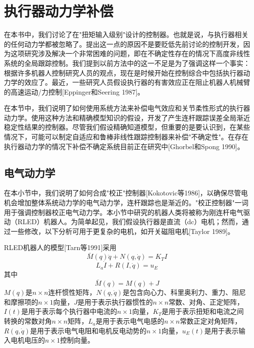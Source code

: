 \documentclass[UTF8]{ctexart}
\begin{document}
\section{执行器动力学补偿}

在本书中，我们讨论了在"扭矩输入级别"设计的控制器。也就是说，与执行器相关的任何动力学都被忽略了。提出这一点的原因不是要贬低先前讨论的控制开发，因为这项研究涉及解决一个非常困难的问题，即在不确定性存在的情况下高度非线性系统的全局跟踪控制。我们提到以前方法中的这一不足是为了强调这样一个事实：根据许多机器人控制研究人员的观点，现在是时候开始在控制综合中包括执行器动力学的效应了。最近，一些研究人员假设执行器的有害效应正在阻止机器人机械臂的高速运动/力控制[Eppinger和Seering 1987]。

在本节中，我们说明了如何使用系统方法来补偿电气效应和关节柔性形式的执行器动力学。使用这种方法和精确模型知识的假设，开发了产生连杆跟踪误差全局渐近稳定性结果的控制器。尽管我们假设精确知道模型，但重要的是要认识到，在某些情况下，可能可以制定自适应和鲁棒非线性跟踪控制器来补偿"不确定性"。在存在执行器动力学的情况下补偿不确定系统目前正在研究中[Ghorbel和Spong 1990]。

\subsection{电气动力学}

在本小节中，我们说明了如何合成"校正"控制器[Kokotovic等1986]，以确保尽管电机会增加整体系统动力学的电气动力学，连杆跟踪也是渐近的。"校正控制器"一词用于强调控制器校正电气动力学。本小节中研究的机器人类将被称为刚连杆电气驱动（RLED）机器人。为简单起见，我们假设执行器是直流（dc）电机；然而，通过一些修改，以下分析可用于更复杂的电机，如开关磁阻电机[Taylor 1989]。

RLED机器人的模型[Tarn等1991]采用
\begin{equation}\label{eq:7.4.1}
\bar{M}(q)\ddot{q} + N(q,\dot{q}) = K_T I
\end{equation}
\begin{equation}\label{eq:7.4.2}
L_a\dot{I} + R(I,\dot{q}) = u_E
\end{equation}
其中
\begin{equation}\label{eq:7.4.3}
\bar{M}(q) = M(q) + J
\end{equation}
$M(q)$是$n \times n$连杆惯性矩阵，$N(q,\dot{q})$是包含向心力、科里奥利力、重力、阻尼和摩擦项的$n \times 1$向量，$J$是用于表示执行器惯性的$n \times n$常数、对角、正定矩阵，$I(t)$是用于表示每个执行器中电流的$n \times 1$向量，$K_T$是用于表示扭矩和电流之间转换的常数对角$n \times n$矩阵，$L_a$是用于表示电气电感的$n \times n$常数正定对角矩阵，$R(q,\dot{q})$是用于表示电气电阻和电机反电动势的$n \times 1$向量，$u_E(t)$是用于表示输入电机电压的$n \times 1$控制向量。
\end{document}

